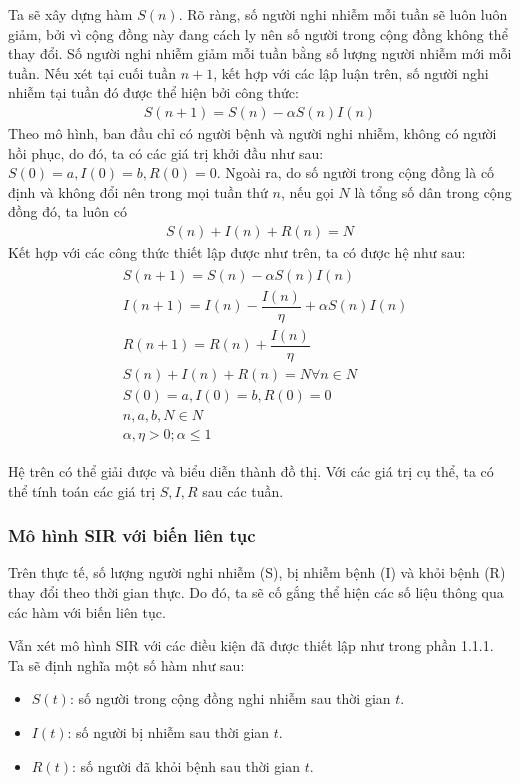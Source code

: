 \documentclass[a4paper]{article}
\begin{document}
Ta sẽ xây dựng hàm $S(n)$. Rõ ràng, số người nghi nhiễm mỗi tuần sẽ luôn luôn giảm, bởi vì cộng đồng này đang cách ly nên số người trong cộng đồng không thể thay đổi. Số người nghi nhiễm giảm mỗi tuần bằng số lượng người nhiễm mới mỗi tuần. Nếu xét tại cuối tuần $n+1$, kết hợp với các lập luận trên, số người nghi nhiễm tại tuần đó được thể hiện bởi công thức:
\begin{align*}
    S(n+1)=S(n)-\alpha S(n)I(n)
\end{align*}
Theo mô hình, ban đầu chỉ có người bệnh và người nghi nhiễm, không có người hồi phục, do đó, ta có các giá trị khởi đầu như sau: $S(0)=a, I(0)=b, R(0)=0$. Ngoài ra, do số người trong cộng đồng là cố định và không đổi nên trong mọi tuần thứ $n$, nếu gọi $N$ là tổng số dân trong cộng đồng đó, ta luôn có
\begin{align*}
   S(n) + I(n) + R(n) = N
\end{align*}
Kết hợp với các công thức thiết lập được như trên, ta có được hệ như sau:
\label{equations: 1}
\begin{align}
    \begin{split}
        & S(n+1)=S(n)-\alpha S(n)I(n) \\
        & I(n+1)=I(n)-\dfrac{I(n)}{\eta}+\alpha S(n)I(n) \\
        & R(n+1)=R(n)+\dfrac{I(n)}{\eta} \\
        & S(n) + I(n) + R(n) = N \forall n \in N \\
        & S(0)=a, I(0)=b, R(0)=0 \\
        & n, a, b, N \in N \\
        & \alpha, \eta > 0; \alpha \leq 1
    \end{split}
\end{align}

Hệ trên có thể giải được và biểu diễn thành đồ thị. Với các giá trị cụ thể, ta có thể tính toán các giá trị $S,I, R$ sau các tuần.
\subsubsection{Mô hình SIR với biến liên tục}
\label{sec: continuous SIR}
Trên thực tế, số lượng người nghi nhiễm (S), bị nhiễm bệnh (I) và khỏi bệnh (R) thay đổi theo thời gian thực. Do đó, ta sẽ cố gắng thể hiện các số liệu thông qua các hàm với biến liên tục.

Vẫn xét mô hình SIR với các điều kiện đã được thiết lập như trong phần 1.1.1. Ta sẽ định nghĩa một số hàm như sau:

\begin{itemize}
    \item $S(t)$: số người trong cộng đồng nghi nhiễm sau thời gian $t$.
    \item $I(t)$: số người bị nhiễm sau thời gian $t$.
    \item $R(t)$: số người đã khỏi bệnh sau thời gian $t$.
\end{itemize}
\end{document}
